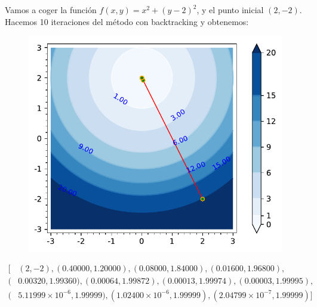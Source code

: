 \begin{example}
	Vamos a coger la función $f(x,y)=x^2+(y-2)^2$, y el punto inicial $(2,-2)$. Hacemos 10 iteraciones del método con backtracking y obtenemos:\\
	\begin{figure}[H]
		\centering
		\includegraphics[scale = 0.6]{imagenes/ejemplo3_maximodescenso.pdf}
	\end{figure}
	\begin{equation*}
		\begin{aligned}
			[&(2,-2),(0.40000,1.20000),(0.08000,1.84000),(0.01600,1.96800), \\
			(&0.00320,1.99360),(0.00064,1.99872),(0.00013,1.99974),(0.00003,1.99995),\\
			(&5.11999×10^{-6},1.99999),(1.02400×10^{-6},1.99999),
			(2.04799×10^{-7},1.99999)]
		\end{aligned}
	\end{equation*}
	
\end{example}

